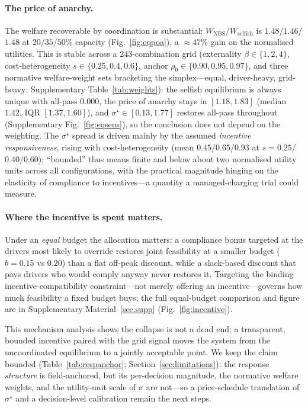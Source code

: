 \documentclass[12pt]{article}
\newcommand{\figref}[1]{Fig.~\ref{#1}}
\begin{document}
\paragraph{The price of anarchy.} The welfare recoverable by coordination is substantial: $W_{\mathrm{NBS}}/W_{\mathrm{selfish}}$ is $1.48$/$1.46$/$1.48$ at $20$/$35$/$50\%$ capacity (\figref{fig:eqpoa}), a $\approx47\%$ gain on the normalised utilities. This is stable across a $243$-combination grid (externality $\beta\in\{1,2,4\}$, cost-heterogeneity $s\in\{0.25,0.4,0.6\}$, anchor $\rho_0\in\{0.90,0.95,0.97\}$, and three normative welfare-weight sets bracketing the simplex---equal, driver-heavy, grid-heavy; Supplementary Table~\ref{tab:weights}): the selfish equilibrium is always unique with all-pass $0.000$, the price of anarchy stays in $[1.18,1.83]$ (median $1.42$, IQR $[1.37,1.60]$), and $\sigma^\star\in[0.13,1.77]$ restores all-pass throughout (Supplementary Fig.~\ref{fig:eqsens}), so the conclusion does not depend on the weighting. The $\sigma^\star$ spread is driven mainly by the assumed \emph{incentive responsiveness}, rising with cost-heterogeneity (mean $0.45$/$0.65$/$0.93$ at $s=0.25$/$0.40$/$0.60$); ``bounded'' thus means finite and below about two normalised utility units across all configurations, with the practical magnitude hinging on the elasticity of compliance to incentives---a quantity a managed-charging trial could measure.

\paragraph{Where the incentive is spent matters.} Under an \emph{equal} budget the allocation matters: a compliance bonus targeted at the drivers most likely to override restores joint feasibility at a smaller budget ($b=0.15$ vs $0.20$) than a flat off-peak discount, while a slack-based discount that pays drivers who would comply anyway never restores it. Targeting the binding incentive-compatibility constraint---not merely offering an incentive---governs how much feasibility a fixed budget buys; the full equal-budget comparison and figure are in Supplementary Material~\ref{sec:supp} (Fig.~\ref{fig:incentive}).

This mechanism analysis shows the collapse is not a dead end: a transparent, bounded incentive paired with the grid signal moves the system from the uncoordinated equilibrium to a jointly acceptable point. We keep the claim bounded (Table~\ref{tab:respanchor}; Section~\ref{sec:limitations}): the response \emph{structure} is field-anchored, but its per-decision magnitude, the normative welfare weights, and the utility-unit scale of $\sigma$ are not---so a price-schedule translation of $\sigma^\star$ and a decision-level calibration remain the next steps.
\end{document}
